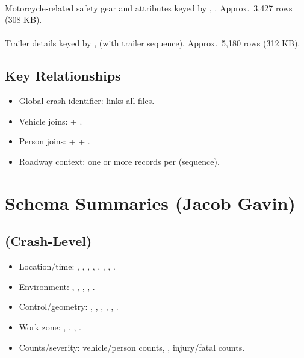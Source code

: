 \documentclass[journal]{IEEEtran}
\begin{document}
\paragraph{}
Motorcycle-related safety gear and attributes keyed by , . Approx.\ 3,427 rows (308 KB).

\paragraph{}
Trailer details keyed by ,  (with trailer sequence). Approx.\ 5,180 rows (312 KB).

\subsection{Key Relationships}
\begin{itemize}
\item Global crash identifier:  links all files.
\item Vehicle joins:  + .
\item Person joins:  +  + .
\item Roadway context: one or more records per  (sequence).
\end{itemize}


\section{Schema Summaries (Jacob Gavin)}

\subsection{ (Crash-Level)}
\begin{itemize}
\item Location/time: , , , , ,
, , .
\item Environment: , , , , .
\item Control/geometry: , , , ,
, .
\item Work zone: , , , .
\item Counts/severity: vehicle/person counts, , injury/fatal counts.
\end{itemize}
\end{document}
